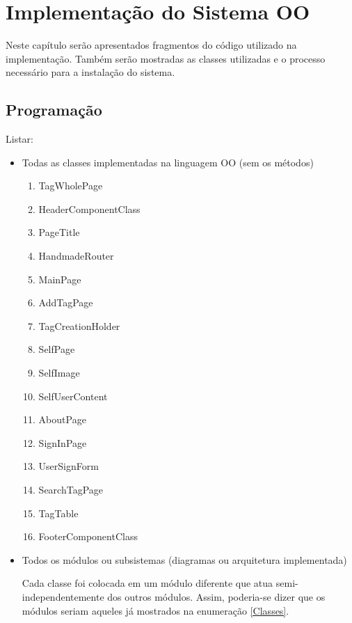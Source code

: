 
\chapter{Implementação do Sistema OO} %

Neste capítulo serão apresentados fragmentos do código utilizado na implementação. Também serão mostradas as classes utilizadas e o processo necessário para a instalação do sistema.

\section{Programação}
    Listar:
    \begin{itemize}
        \item Todas as classes implementadas na linguagem OO (sem os métodos)
                
            \begin{enumerate}
                \item TagWholePage
                \item HeaderComponentClass
                \item PageTitle
                \item HandmadeRouter
                \item MainPage
                \item AddTagPage
                \item TagCreationHolder
                \item SelfPage
                \item SelfImage
                \item SelfUserContent
                \item AboutPage
                \item SignInPage
                \item UserSignForm
                \item SearchTagPage
                \item TagTable
                \item FooterComponentClass
            \end{enumerate}

        \item Todos os módulos ou subsistemas (diagramas ou arquitetura implementada)

            Cada classe foi colocada em um módulo diferente que atua semi-independentemente dos outros módulos. Assim, poderia-se dizer que os módulos seriam aqueles já mostrados na enumeração \ref{Classes}.
    

\end{itemize}
